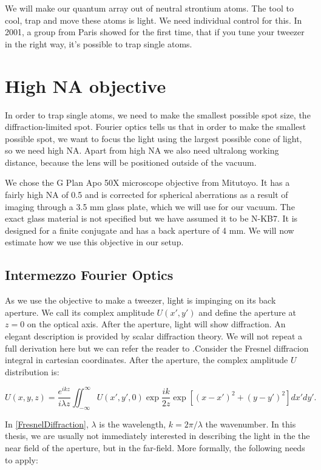 We will make our quantum array out of neutral strontium atoms. The tool to cool, trap and move these atoms is light. We need individual control for this. In 2001, a group from Paris showed for the first time, that if you tune your tweezer in the right way, it's possible to trap single atoms.         
\section{High NA objective}

In order to trap single atoms, we need to make the smallest possible spot size, the diffraction-limited spot. Fourier optics tells us that in order to make the smallest possible spot, we want to focus the light using the largest possible cone of light, so we need high NA. Apart from high NA we also need ultralong working distance, because the lens will be positioned outside of the vacuum. 

We chose the G Plan Apo 50X microscope objective from Mitutoyo. It has a fairly high NA of 0.5 and is corrected for spherical aberrations as a result of imaging through a 3.5 mm glass plate, which we will use for our vacuum. The exact glass material is not specified but we have assumed it to be N-KB7. It is designed for a finite conjugate and has a back aperture of 4 mm. We will now estimate how we use this objective in our setup. 

\subsection{Intermezzo Fourier Optics}

As we use the objective to make a tweezer, light is impinging on its back aperture. We call its complex amplitude $U(x',y')$ and define the aperture at $z = 0$ on the optical axis. After the aperture, light will show diffraction. An elegant description is provided by scalar diffraction theory. We will not repeat a full derivation here but we can refer the reader to \cite{Goodman2005}.Consider the Fresnel diffracion integral in cartesian coordinates. After the aperture, the complex amplitude $U$ distribution is:

\begin{equation}\label{FresnelDiffraction}
    U(x,y,z) = 
    \frac{e^{ikz}}{i \lambda z} \iint_{-\infty}^{\infty} U(x',y',0) \exp{\frac{ik}{2z}} \exp{\left[(x-x')^2+(y-y')^2\right]} dx'dy'.
\end{equation}

In \cref{FresnelDiffraction}, $\lambda$ is the wavelength, $k=2\pi/\lambda$ the wavenumber. In this thesis, we are usually not immediately interested in describing the light in the the near field of the aperture, but in the far-field. More formally, the following needs to apply:


